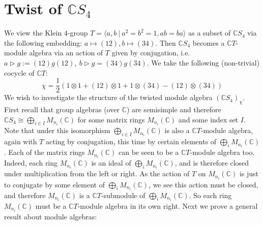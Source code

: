 \documentclass[11pt]{article}
\title{}
\author{Ted Jones-Healey}
\date{}
\newcommand{\Cc}{\mathbb{C}}
\theoremstyle{definition}
\begin{document}
\tableofcontents

\section{Twist of \texorpdfstring{$\Cc S_4$}{a}}
We view the Klein $4$-group $T=\langle a,b\ |\ a^2=b^2=1, ab=ba\rangle$ as a subset of $\Cc S_4$ via the following embedding: $a\mapsto (12), b\mapsto (34)$. Then $\Cc S_4$ becomes a $\Cc T$-module algebra via an action of $T$ given by conjugation, i.e.  $a\rhd g:=(12)g(12),\ b\rhd g=(34)g(34)$. We take the following (non-trivial) cocycle of $\Cc T$:
$$\chi=\frac{1}{2}(1\otimes 1+(12)\otimes 1+1\otimes (34)-(12)\otimes (34))$$
We wish to investigate the structure of the twisted module algebra $(\Cc S_4)_\chi$. First recall that group algebras (over $\Cc$) are semisimple and therefore $\Cc S_4\cong \bigoplus_{i\in I} M_{n_i}(\Cc)$ for some matrix rings $M_{n_i}(\Cc)$ and some index set $I$. Note that under this isomorphism $\bigoplus_{i\in I} M_{n_i}(\Cc)$ is also a $\Cc T$-module algebra, again with $T$ acting by conjugation, this time by certain elements of $\bigoplus_i M_{n_i}(\Cc)$. Each of the matrix rings $M_{n_i}(\Cc)$ can be seen to be a $\Cc T$-module algebra too. Indeed, each ring $M_{n_i}(\Cc)$ is an ideal of $\bigoplus_i M_{n_i}(\Cc)$, and is therefore closed under multiplication from the left or right. As the action of $T$ on $M_{n_i}(\Cc)$ is just to conjugate by some element of $\bigoplus_i M_{n_i}(\Cc)$, we see this action must be closed, and therefore $M_{n_i}(\Cc)$ is a $\Cc T$-submodule of $\bigoplus_i M_{n_i}(\Cc)$. So each ring $M_{n_i}(\Cc)$ must be a $\Cc T$-module algebra in its own right.
Next we prove a general result about module algebras:
\end{document}

